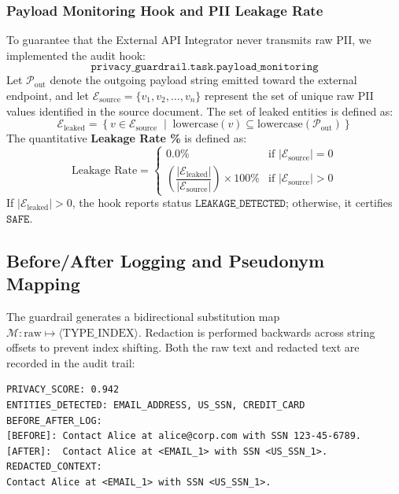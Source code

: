\documentclass[10pt,a4paper]{article}
\begin{document}
\subsubsection{Payload Monitoring Hook and PII Leakage Rate}
To guarantee that the External API Integrator never transmits raw PII, we implemented the audit hook:
\[
\texttt{privacy\_guardrail.task.payload\_monitoring}
\]
Let $\mathcal{P}_{\text{out}}$ denote the outgoing payload string emitted toward the external endpoint, and let $\mathcal{E}_{\text{source}} = \{v_1, v_2, \dots, v_n\}$ represent the set of unique raw PII values identified in the source document. The set of leaked entities is defined as:
\begin{equation}
\mathcal{E}_{\text{leaked}} = \left\{ v \in \mathcal{E}_{\text{source}} \;\middle|\; \text{lowercase}(v) \subseteq \text{lowercase}(\mathcal{P}_{\text{out}}) \right\}
\end{equation}
The quantitative \textbf{Leakage Rate \%} is defined as:
\begin{equation}
\text{Leakage Rate} = 
\begin{cases}
0.0\% & \text{if } |\mathcal{E}_{\text{source}}| = 0 \\
\left( \dfrac{|\mathcal{E}_{\text{leaked}}|}{|\mathcal{E}_{\text{source}}|} \right) \times 100\% & \text{if } |\mathcal{E}_{\text{source}}| > 0
\end{cases}
\end{equation}
If $|\mathcal{E}_{\text{leaked}}| > 0$, the hook reports status $\texttt{LEAKAGE\_DETECTED}$; otherwise, it certifies $\texttt{SAFE}$.

\subsection{Before/After Logging and Pseudonym Mapping}
The guardrail generates a bidirectional substitution map $\mathcal{M}: \text{raw} \mapsto \langle \text{TYPE\_INDEX} \rangle$. Redaction is performed backwards across string offsets to prevent index shifting. Both the raw text and redacted text are recorded in the audit trail:

\begin{verbatim}
PRIVACY_SCORE: 0.942
ENTITIES_DETECTED: EMAIL_ADDRESS, US_SSN, CREDIT_CARD
BEFORE_AFTER_LOG:
[BEFORE]: Contact Alice at alice@corp.com with SSN 123-45-6789.
[AFTER]:  Contact Alice at <EMAIL_1> with SSN <US_SSN_1>.
REDACTED_CONTEXT:
Contact Alice at <EMAIL_1> with SSN <US_SSN_1>.
\end{verbatim}
\end{document}
